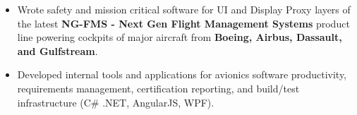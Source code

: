 \begin{itemize}
    \item Wrote safety and mission critical software for UI and Display Proxy layers of the latest \textbf{NG-FMS - Next Gen Flight Management Systems} product line powering cockpits of major aircraft from \textbf{Boeing, Airbus, Dassault, and Gulfstream}.
    \item Developed internal tools and applications for avionics software productivity, requirements management, certification reporting, and build/test infrastructure (C\# .NET, AngularJS, WPF).
\end{itemize}